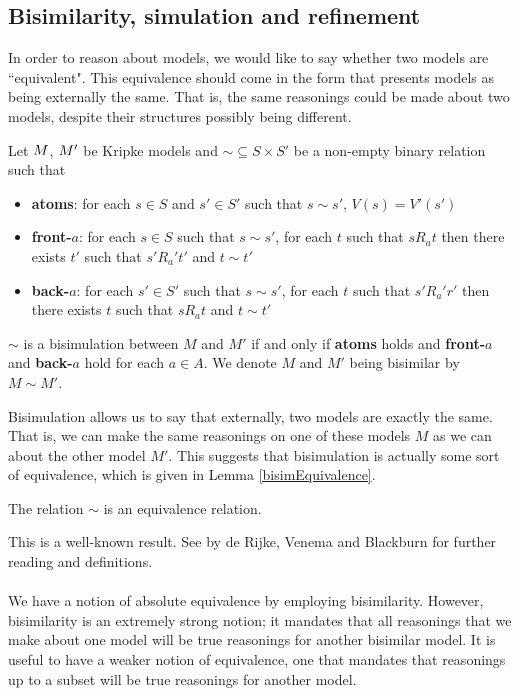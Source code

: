 \subsection{Bisimilarity, simulation and refinement}

In order to reason about models, we would like to say whether two models are ``equivalent".
This equivalence should come in the form that presents models as being externally the same.
That is, the same reasonings could be made about two models, despite their structures possibly being
different.

\begin{defn} \label{bisimKripke}
	Let $M$, $M'$ be Kripke models and $\sim \subseteq S \times S'$ be a non-empty binary
	relation such that
	\begin{itemize}
		\item {\bf atoms}: for each $s \in S$ and $s' \in S'$ such that $s \sim s'$, $V(s) = V'(s')$
		\item {\bf front-$a$}: for each $s \in S$ such that $s \sim s'$, for each $t$ such that
		$s R_a t$ then there exists $t'$ such that $s' R_a' t'$ and $t \sim t'$
		\item {\bf back-$a$}: for each $s' \in S'$ such that $s \sim s'$, for each $t$ such that
		$s' R_a' r'$ then there exists $t$ such that $s R_a t$ and $t \sim t'$
	\end{itemize}
	$\sim$ is a bisimulation between $M$ and $M'$ if and only if {\bf atoms} holds and {\bf front-$a$}
	and {\bf back-$a$} hold for each $a \in A$.
	We denote $M$ and $M'$ being bisimilar by $M \sim M'$.
\end{defn}

Bisimulation allows us to say that externally, two models are exactly the same.
That is, we can make the same reasonings on one of these models $M$ as we can about the other model
$M'$.
This suggests that bisimulation is actually some sort of equivalence, which is given in Lemma
\ref{bisimEquivalence}.

\begin{lemma} \label{bisimEquivalence}
	The relation $\sim$ is an equivalence relation.
\end{lemma}

This is a well-known result.
See \cite{blackburn2002modal} by de Rijke, Venema and Blackburn for further reading and
definitions.\\
\\
We have a notion of absolute equivalence by employing bisimilarity.
However, bisimilarity is an extremely strong notion; it mandates that all reasonings that we make
about one model will be true reasonings for another bisimilar model.
It is useful to have a weaker notion of equivalence, one that mandates that reasonings up to a
subset will be true reasonings for another model.

